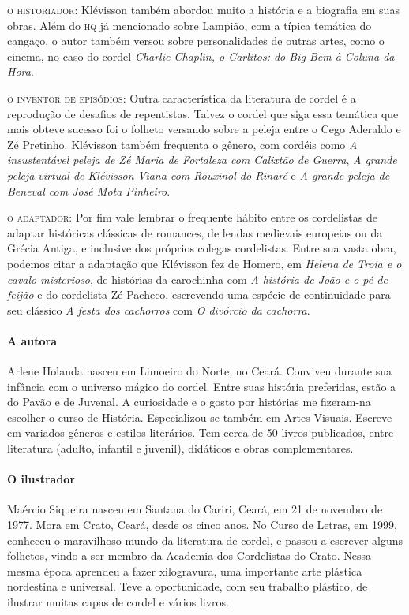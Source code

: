 \documentclass[11pt]{extarticle}
\begin{document}
\noindent\textsc{o historiador}: Klévisson também abordou muito a história e a biografia em suas obras. Além do \textsc{hq} já mencionado sobre Lampião, com a típica temática do cangaço, o autor também versou sobre personalidades de outras artes, como o cinema, no caso do cordel \textit{Charlie Chaplin, o Carlitos: do Big Bem à Coluna da Hora}.

\noindent\textsc{o inventor de episódios}: Outra característica da literatura de cordel é a reprodução de desafios de repentistas. Talvez o cordel que siga essa temática que mais obteve sucesso foi o folheto versando sobre a peleja entre o Cego Aderaldo e Zé Pretinho. Klévisson também frequenta o gênero, com cordéis como \textit{A insustentável
peleja de Zé Maria de Fortaleza com Calixtão de Guerra}, \textit{A grande peleja virtual de Klévisson Viana com Rouxinol do Rinaré} e \textit{A grande peleja de Beneval com José Mota Pinheiro}.

\noindent\textsc{o adaptador}: Por fim vale lembrar o frequente hábito entre os cordelistas de adaptar históricas clássicas de romances, de lendas medievais europeias ou da Grécia Antiga, e inclusive dos próprios colegas cordelistas. Entre sua vasta obra, podemos citar a adaptação que Klévisson fez de Homero, em \textit{Helena de Troia e o cavalo misterioso}, de histórias da carochinha com \textit{A história de João e o pé de feijão} e do cordelista Zé Pacheco, escrevendo uma espécie de continuidade para seu clássico \textit{A festa dos cachorros} com \textit{O divórcio da cachorra}.

\paragraph{A autora}
Arlene Holanda nasceu em Limoeiro do Norte, no Ceará. Conviveu durante sua infância com o universo mágico do cordel. Entre suas história preferidas, estão a do Pavão e de
Juvenal. A curiosidade e o gosto por histórias me fizeram-na escolher o curso de História. Especializou-se também em Artes Visuais. Escreve em variados gêneros e estilos literários. Tem cerca de 50 livros publicados, entre literatura (adulto, infantil e juvenil), didáticos e obras complementares.


\paragraph{O ilustrador}
Maércio Siqueira nasceu em Santana do Cariri, Ceará, em 21 de novembro de 1977.
Mora em Crato, Ceará, desde os cinco anos. No Curso de Letras, em 1999, conheceu o
maravilhoso mundo da literatura de cordel, e passou a escrever alguns
folhetos, vindo a ser membro da Academia dos Cordelistas do Crato.
Nessa mesma época aprendeu a fazer xilogravura, uma importante arte
plástica nordestina e universal. Teve a oportunidade, com seu trabalho plástico, de ilustrar muitas capas de cordel e vários livros.
\end{document}

